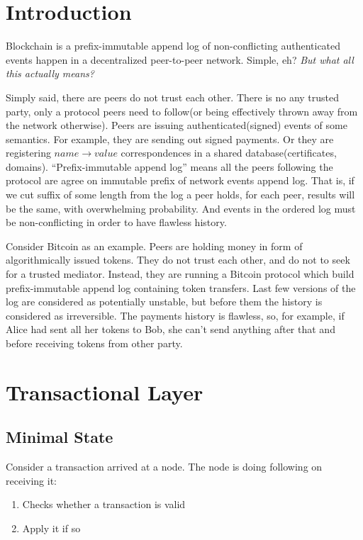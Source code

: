 \documentclass[]{report}   %
\begin{document}
\section{Introduction}     

Blockchain is a prefix-immutable append log of non-conflicting authenticated events happen in a decentralized peer-to-peer network. Simple, eh? \textit{But what all this actually means?}

Simply said, there are peers do not trust each other. There is no any trusted party, only a protocol peers need to follow(or being effectively thrown away from the network otherwise). Peers are issuing authenticated(signed) events of some semantics. For example, they are sending out signed payments. Or they are registering \(name \rightarrow value\) correspondences in a shared database(certificates, domains). ``Prefix-immutable append log'' means all the peers following the protocol are agree on immutable prefix of network events append log. That is, if we cut suffix of some length from the log a peer holds, for each peer, results will be the same, with overwhelming probability. And events in the ordered log must be non-conflicting in order to have flawless history.

Consider Bitcoin as an example. Peers are holding money in form of algorithmically issued tokens. They do not trust each other, and do not to seek for a trusted mediator. Instead, they are running a Bitcoin protocol which build prefix-immutable append log containing token transfers. Last few versions of the log are considered as potentially unstable, but before them the history is considered as irreversible. The payments history is flawless, so, for example, if Alice had sent all her tokens to Bob, she can't send anything after that and before receiving tokens from other party.

\section{Transactional Layer}

\subsection{Minimal State}     %
	Consider a transaction arrived at a node. The node is doing following on receiving it:

    \begin{enumerate}
		\item Checks whether a transaction is valid

		\item Apply it if so
    \end{enumerate}
\end{document}
